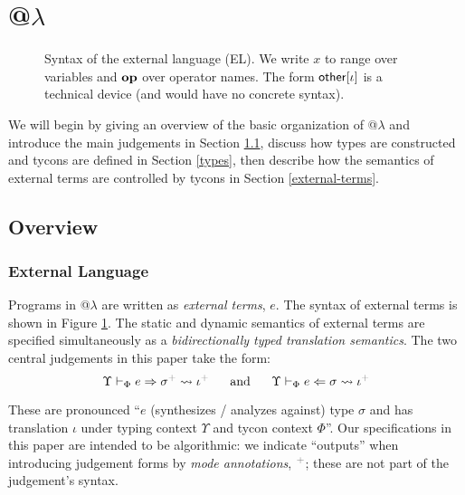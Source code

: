\documentclass{llncs}
\newcommand{\moutput}{^{\color{gray}+}}
\begin{document}
\section{@$\lambda$}\label{atlam}
\begin{figure}[t]
\hspace{-2px}
\caption{Syntax of the external language (EL). We write $x$ to range over variables and $\textbf{op}$ over operator names. The form ${\sf other}[\iota]$ is a technical device (and would have no concrete syntax).}\label{syntax-EL}
\end{figure}



We will begin by giving an overview of the basic organization of @$\lambda$ and introduce the main judgements in Section \ref{overview}, discuss how types are constructed and tycons are defined in Section \ref{types}, then describe how the semantics of external terms are controlled by tycons in Section \ref{external-terms}.

\subsection{Overview}\label{overview}
\vspace{-5px}
\subsubsection{External Language}
Programs in @$\lambda$ are written as \emph{external terms}, $e$. The syntax of external terms is shown in Figure \ref{syntax-EL}. %
The static and dynamic semantics of external terms are specified simultaneously as a \emph{bidirectionally typed translation semantics}. The two central judgements in this paper take the form:  \[\esynX{e}{\st\moutput}{\iota\moutput} ~~~~~\text{and}~~~~~ \eanaX{e}{\st}{\iota\moutput}\]
\noindent

These are pronounced ``$e$ (synthesizes / analyzes against) type $\sigma$ and has  translation $\iota$ under typing context $\Upsilon$ and tycon context $\Phi$''. Our specifications in this paper are intended to be algorithmic: we indicate ``outputs'' when introducing judgement forms by \emph{mode annotations}, $\moutput$; these are not part of the judgement's syntax. 
\end{document}
